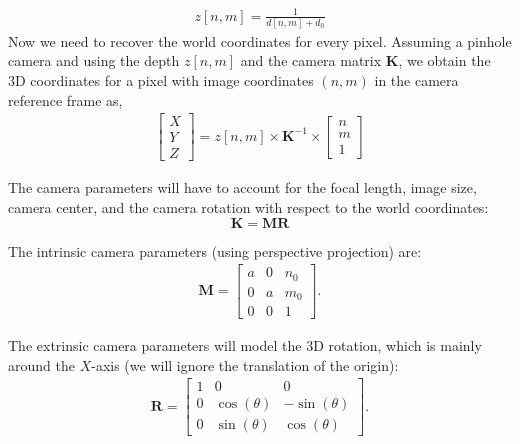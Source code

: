 \begin{align}
    z \left[n,m \right] = \frac{1}{ d \left[n,m \right] + d_0}
\end{align}
Now we need to recover the world coordinates for every pixel.
Assuming a pinhole camera and using the depth $z \left[n,m \right]$ and the camera matrix $\mathbf{K}$, we obtain the 3D coordinates for a pixel with image coordinates $(n,m)$ in the camera reference frame as,
\begin{align}
    \begin{bmatrix}
        X \\
        Y \\
        Z
    \end{bmatrix}
    = z\left[n,m \right] \times \mathbf{K}^{-1} \times
    \begin{bmatrix}
        n \\
        m \\
        1
    \end{bmatrix}
    \label{eq:recoverworldcoord}
\end{align}


The camera parameters will have to account for the focal length, image size, camera center, and the camera rotation  with respect to the world coordinates:
\begin{equation}
    \mathbf{K} = \mathbf{M} \mathbf{R}
\end{equation}


The intrinsic camera parameters (using perspective projection) are:
\begin{align}
    \mathbf{M}
    =
    \begin{bmatrix}
        a & 0 & n_0 \\
        0 & a & m_0 \\
        0 & 0 & 1
    \end{bmatrix}.
\end{align}


The extrinsic camera parameters will model the 3D rotation, which is mainly around the $X$-axis (we will ignore the translation of the origin):
\begin{align}
    \mathbf{R}
    =
    \begin{bmatrix}
        1 & 0            & 0             \\
        0 & \cos(\theta) & -\sin(\theta) \\
        0 & \sin(\theta) & \cos(\theta)
    \end{bmatrix}.
\end{align}

